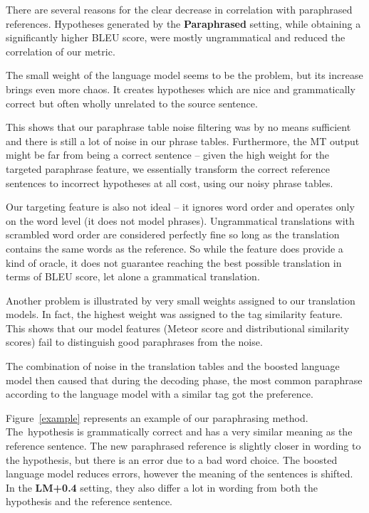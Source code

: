 \documentclass[11pt]{article}
\def\Fref#1{Figure~\ref{#1}}
\begin{document}
There are several reasons for the clear decrease in correlation with paraphrased 
references. Hypotheses generated by the \textbf{Paraphrased} setting, while obtaining 
a significantly higher BLEU score, were mostly ungrammatical and reduced the 
correlation of our metric.

The small weight of the language model seems to be the problem, but its increase brings
even more chaos. It creates hypotheses which are nice and grammatically correct 
but often wholly unrelated to the source sentence.

This shows that our paraphrase table noise filtering was by no means sufficient and
there is still a lot of noise in our phrase tables. Furthermore, the MT output
might be far from being a correct sentence -- given the high weight for the targeted 
paraphrase feature, we essentially transform the correct reference 
sentences to incorrect hypotheses at all cost, using our noisy phrase tables.

Our targeting feature is also not ideal -- it ignores word order and operates
only on the word level (it does not model phrases). Ungrammatical translations
with scrambled word order are considered perfectly fine so long as the
translation contains the same words as the reference. So while the feature does
provide a kind of oracle, it does not guarantee reaching the best possible
translation in terms of BLEU score, let alone a grammatical translation.

Another problem is illustrated by very small weights assigned to our translation
models. In fact, the highest weight was assigned to the tag similarity feature.
This shows that our model features (Meteor score and distributional
similarity scores) fail to distinguish good paraphrases from the noise. 

The combination of noise in the translation tables and the boosted language
model then caused that during the decoding phase, the most common paraphrase
according to the language model with a similar tag got the preference. 

\Fref{example} represents an example of our paraphrasing method. The~hypothesis is 
grammatically correct and has a very similar meaning as the reference sentence. The 
new paraphrased reference is slightly closer in wording to the hypothesis, but there 
is an error due to a bad word choice. The boosted language model reduces errors, 
however the meaning of the sentences is shifted. In the \textbf{LM+0.4} setting, 
they also differ a lot in wording from both the hypothesis and the reference sentence.
\end{document}
